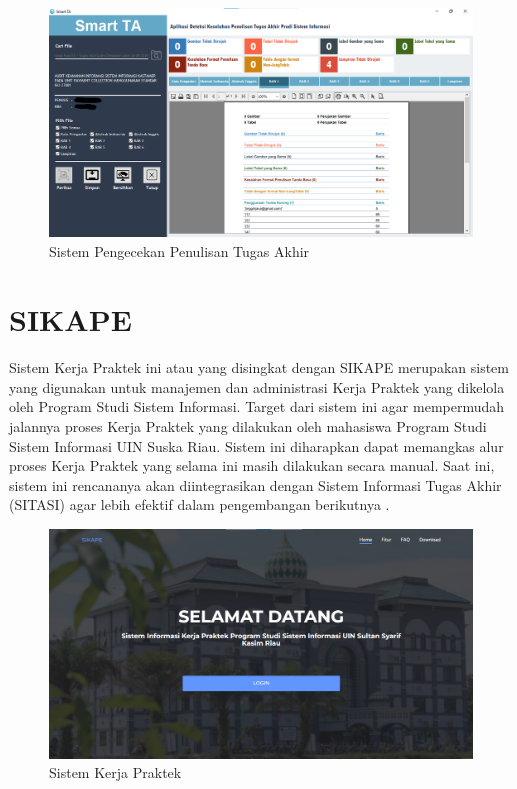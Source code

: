 \begin{figure}
	\centering
	\includegraphics[width=0.82\linewidth]{konten//gambar/smartta.png}
	\caption{Sistem Pengecekan Penulisan Tugas Akhir \protect\cite{web-prodi}}
	\label{fig:enter-label}
\end{figure}

\section{SIKAPE}
Sistem Kerja Praktek ini atau yang disingkat dengan SIKAPE merupakan sistem yang digunakan untuk manajemen dan administrasi Kerja Praktek yang dikelola oleh Program Studi Sistem Informasi. Target dari sistem ini agar mempermudah jalannya proses Kerja Praktek yang dilakukan oleh mahasiswa Program Studi Sistem Informasi UIN Suska Riau. Sistem ini diharapkan dapat memangkas alur proses Kerja Praktek yang selama ini masih dilakukan secara manual. Saat ini, sistem ini rencananya akan diintegrasikan dengan Sistem Informasi Tugas Akhir (SITASI) agar lebih efektif dalam pengembangan berikutnya \cite{web-prodi}.

\begin{figure}
	\centering
	\includegraphics[width=0.82\linewidth]{konten//gambar/sikape.png}
	\caption{Sistem Kerja Praktek \protect\cite{web-prodi}}
	\label{fig:enter-label}
\end{figure}

